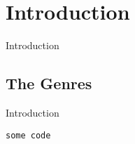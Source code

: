\chapter{Introduction}
Introduction

\section{The Genres}
Introduction

\begin{lstlisting}[title=intro.clj]
some code
\end{lstlisting}